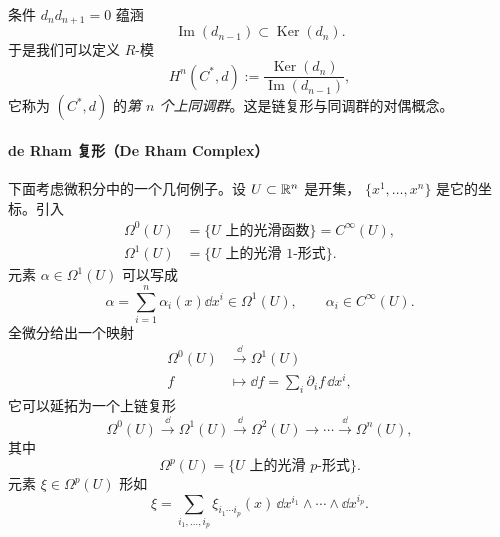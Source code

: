 
条件 $d_{n}d_{n+1}=0$ 蕴涵
\[
  \operatorname{Im}(d_{n-1})\subset\operatorname{Ker}(d_{n}).
\]
于是我们可以定义 $R$-模
\[
  H^{n}(C^{*},d):=\frac{\operatorname{Ker}(d_{n})}{\operatorname{Im}(d_{n-1})},
\]
它称为 $(C^{*},d)$ 的\emph{第 $n$ 个上同调群}。这是链复形与同调群的对偶概念。


\paragraph{de Rham 复形（De Rham Complex）}

下面考虑微积分中的一个几何例子。设 $U\subset\mathbb{R}^n$ 是开集，
$\{x^{1},\ldots,x^{n}\}$ 是它的坐标。引入
\[
  \begin{aligned}
    \Omega^{0}(U)&=\{\text{$U$ 上的光滑函数}\}=C^{\infty}(U),\\
    \Omega^{1}(U)&=\{\text{$U$ 上的光滑 $1$-形式}\}.
  \end{aligned}
\]
元素 $\alpha\in\Omega^{1}(U)$ 可以写成
\[
  \alpha=\sum_{i=1}^{n}\alpha_{i}(x)\dd x^{i}\in\Omega^{1}(U),
  \qquad \alpha_{i}\in C^{\infty}(U).
\]
全微分给出一个映射
\[
  \begin{aligned}
    \Omega^{0}(U)&\xrightarrow{\ \dd\ }\Omega^{1}(U)\\
    f&\longmapsto \dd f=\sum_{i}\partial_{i}f\,\dd x^{i},
  \end{aligned}
\]
它可以延拓为一个上链复形
\[
  \Omega^{0}(U)\xrightarrow{\ \dd\ }\Omega^{1}(U)\xrightarrow{\ \dd\ }
  \Omega^{2}(U)\to\cdots\xrightarrow{\ \dd\ }\Omega^{n}(U),
\]
其中
\[
  \Omega^{p}(U)=\{\text{$U$ 上的光滑 $p$-形式}\}.
\]
元素 $\xi\in\Omega^{p}(U)$ 形如
\[
  \xi=\sum_{i_{1},\ldots,i_{p}}\xi_{i_{1}\cdots i_{p}}(x)\,
  \dd x^{i_{1}}\wedge\cdots\wedge\dd x^{i_{p}}.
\]

